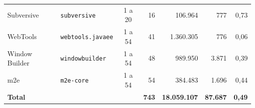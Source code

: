 \begin{table}[htbp]
\begin{tabular}{llcrrrr}
        Subversive      & \texttt{subversive}           & 1 a 20  & 16 &   106.964 &    777 & 0,73 \\
        WebTools        & \texttt{webtools.javaee}      & 1 a 54  & 41 & 1.360.305 &    776 & 0,06 \\
        Window Builder  & \texttt{windowbuilder}        & 1 a 54  & 48 &   989.950 &  3.871 & 0,39 \\
        m2e             & \texttt{m2e-core}             & 1 a 54  & 54 &   384.483 &  1.696 & 0,44 \\
        \midrule
        \textbf{Total}  &                               &        & \textbf{743} & \textbf{18.059.107} & \textbf{87.687} & \textbf{0,49} \\
        \bottomrule
    \end{tabular}
\end{table}%
